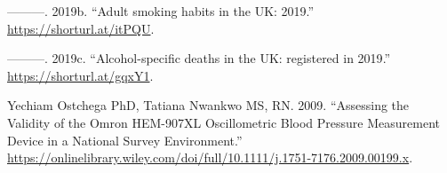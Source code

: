 \documentclass[
  11pt,
  twocolumn]{article}
\newlength{\cslhangindent}
\newlength{\cslentryspacingunit} %
\newenvironment{CSLReferences}[2] %
 {%
  \setlength{\parindent}{0pt}
  \ifodd #1
  \let\oldpar\par
  \def\par{\hangindent=\cslhangindent\oldpar}
  \fi
  \setlength{\parskip}{#2\cslentryspacingunit}
 }%
 {}
\begin{document}
\begin{CSLReferences}{1}{0}
\leavevmode{}%
---------. 2019b. {``{Adult smoking habits in the UK: 2019}.''}
\url{https://shorturl.at/itPQU}.

\leavevmode{}%
---------. 2019c. {``{Alcohol-specific deaths in the UK: registered in
2019}.''} \url{https://shorturl.at/gqxY1}.

\leavevmode{}%
Yechiam Ostchega PhD, Tatiana Nwankwo MS, RN. 2009. {``{Assessing the
Validity of the Omron HEM-907XL Oscillometric Blood Pressure Measurement
Device in a National Survey Environment}.''}
\url{https://onlinelibrary.wiley.com/doi/full/10.1111/j.1751-7176.2009.00199.x}.

\end{CSLReferences}
\end{document}
